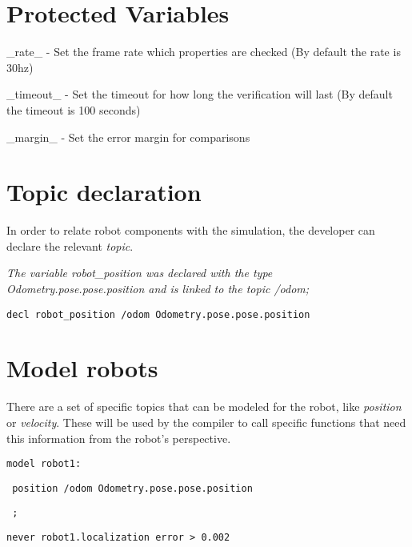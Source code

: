 \section{Protected Variables}

\_rate\_ - Set the frame rate which properties are checked (By default the rate is 30hz)

\_timeout\_ - Set the timeout for how long the verification will last (By default the timeout is 100 seconds)

\_margin\_ - Set the error margin for comparisons

\section{Topic declaration}

In order to relate robot components with the simulation, the developer can declare the relevant \textit{topic}.

\textit{The variable robot\_position was declared with the type Odometry.pose.pose.position and is linked to the topic /odom;}


\texttt{decl robot\_position /odom Odometry.pose.pose.position}

\section{Model robots}

There are a set of specific topics that can be modeled for the robot, like \textit{position} or \textit{velocity}. These will be used by the compiler to call specific functions that need this information from the robot's perspective.


\texttt{model robot1:}

\texttt{    position /odom Odometry.pose.pose.position}

\texttt{    ;}


\texttt{never robot1.localization error > 0.002}

